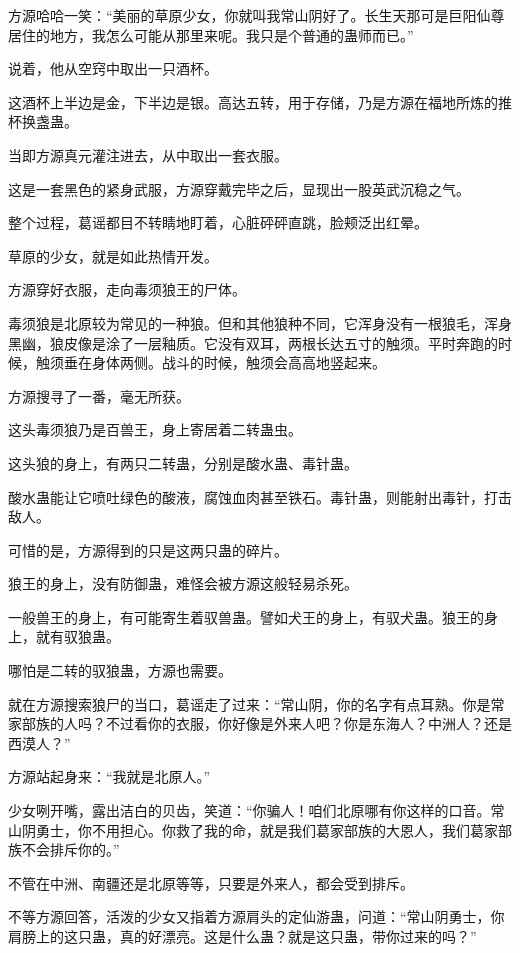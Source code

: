 \begin{this_body}
方源哈哈一笑：“美丽的草原少女，你就叫我常山阴好了。长生天那可是巨阳仙尊居住的地方，我怎么可能从那里来呢。我只是个普通的蛊师而已。”

说着，他从空窍中取出一只酒杯。

这酒杯上半边是金，下半边是银。高达五转，用于存储，乃是方源在福地所炼的推杯换盏蛊。

当即方源真元灌注进去，从中取出一套衣服。

这是一套黑色的紧身武服，方源穿戴完毕之后，显现出一股英武沉稳之气。

整个过程，葛谣都目不转睛地盯着，心脏砰砰直跳，脸颊泛出红晕。

草原的少女，就是如此热情开发。

方源穿好衣服，走向毒须狼王的尸体。

毒须狼是北原较为常见的一种狼。但和其他狼种不同，它浑身没有一根狼毛，浑身黑幽，狼皮像是涂了一层釉质。它没有双耳，两根长达五寸的触须。平时奔跑的时候，触须垂在身体两侧。战斗的时候，触须会高高地竖起来。

方源搜寻了一番，毫无所获。

这头毒须狼乃是百兽王，身上寄居着二转蛊虫。

这头狼的身上，有两只二转蛊，分别是酸水蛊、毒针蛊。

酸水蛊能让它喷吐绿色的酸液，腐蚀血肉甚至铁石。毒针蛊，则能射出毒针，打击敌人。

可惜的是，方源得到的只是这两只蛊的碎片。

狼王的身上，没有防御蛊，难怪会被方源这般轻易杀死。

一般兽王的身上，有可能寄生着驭兽蛊。譬如犬王的身上，有驭犬蛊。狼王的身上，就有驭狼蛊。

哪怕是二转的驭狼蛊，方源也需要。

就在方源搜索狼尸的当口，葛谣走了过来：“常山阴，你的名字有点耳熟。你是常家部族的人吗？不过看你的衣服，你好像是外来人吧？你是东海人？中洲人？还是西漠人？”

方源站起身来：“我就是北原人。”

少女咧开嘴，露出洁白的贝齿，笑道：“你骗人！咱们北原哪有你这样的口音。常山阴勇士，你不用担心。你救了我的命，就是我们葛家部族的大恩人，我们葛家部族不会排斥你的。”

不管在中洲、南疆还是北原等等，只要是外来人，都会受到排斥。

不等方源回答，活泼的少女又指着方源肩头的定仙游蛊，问道：“常山阴勇士，你肩膀上的这只蛊，真的好漂亮。这是什么蛊？就是这只蛊，带你过来的吗？”


\end{this_body}
